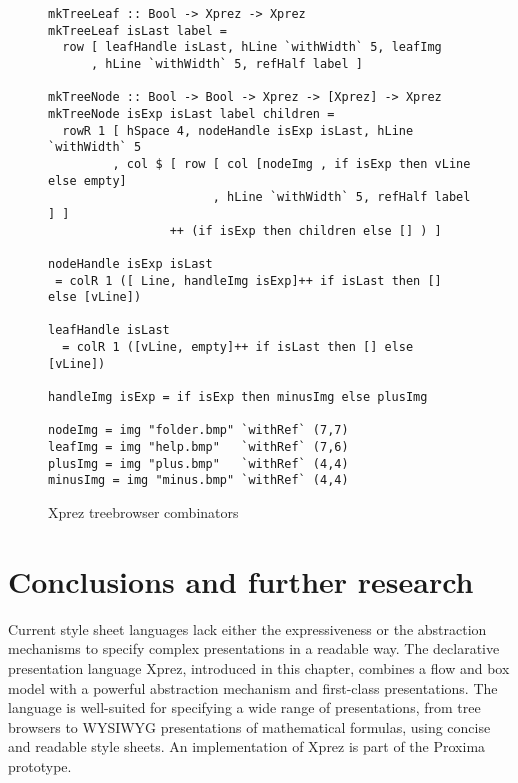 \begin{figure}[t] %
\begin{small}
\begin{center}
\begin{footnotesize}
\begin{verbatim}
mkTreeLeaf :: Bool -> Xprez -> Xprez
mkTreeLeaf isLast label = 
  row [ leafHandle isLast, hLine `withWidth` 5, leafImg
      , hLine `withWidth` 5, refHalf label ] 

mkTreeNode :: Bool -> Bool -> Xprez -> [Xprez] -> Xprez
mkTreeNode isExp isLast label children =
  rowR 1 [ hSpace 4, nodeHandle isExp isLast, hLine `withWidth` 5
         , col $ [ row [ col [nodeImg , if isExp then vLine else empty]
                       , hLine `withWidth` 5, refHalf label ] ]
                 ++ (if isExp then children else [] ) ]

nodeHandle isExp isLast 
 = colR 1 ([ Line, handleImg isExp]++ if isLast then [] else [vLine])

leafHandle isLast 
  = colR 1 ([vLine, empty]++ if isLast then [] else [vLine])

handleImg isExp = if isExp then minusImg else plusImg

nodeImg = img "folder.bmp" `withRef` (7,7)
leafImg = img "help.bmp"   `withRef` (7,6)
plusImg = img "plus.bmp"   `withRef` (4,4)
minusImg = img "minus.bmp" `withRef` (4,4)
\end{verbatim}
\end{footnotesize}
\caption{{\sc Xprez} treebrowser combinators}\label{treeCombinators} 
\end{center}
\end{small}
\end{figure}


%																
\section{Conclusions and further research}  \label{sect:conclusions}


Current style sheet languages lack either the expressiveness or the abstraction mechanisms to specify complex presentations in a readable way. The declarative presentation language {\sc Xprez}, introduced in this chapter, combines a flow and box model with a powerful abstraction mechanism and first-class presentations. The language is well-suited for specifying a wide range of presentations, from tree browsers to WYSIWYG presentations of mathematical formulas, using concise and readable style sheets. An implementation of {\sc Xprez} is part of the Proxima prototype. 

